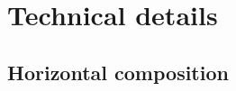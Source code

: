 \documentclass[sigplan,10pt,review]{acmart}
\begin{document}

\section{Technical details} \label{sec:details} %

%
%
%

\subsection{Horizontal composition} %
\end{document}
